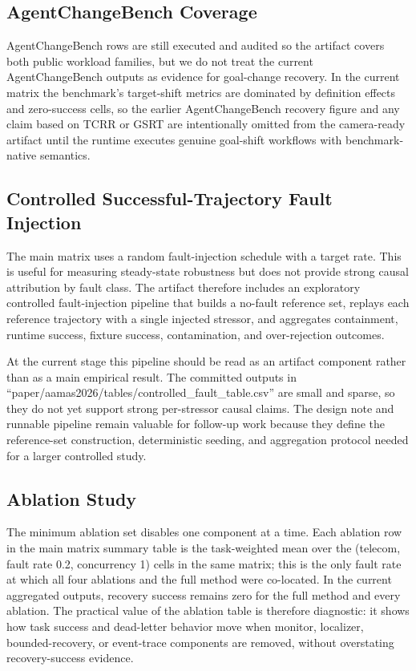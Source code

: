 \subsection{AgentChangeBench Coverage}

AgentChangeBench rows are still executed and audited so the artifact covers both public workload families, but we do not treat the current AgentChangeBench outputs as evidence for goal-change recovery. In the current matrix the benchmark's target-shift metrics are dominated by definition effects and zero-success cells, so the earlier AgentChangeBench recovery figure and any claim based on TCRR or GSRT are intentionally omitted from the camera-ready artifact until the runtime executes genuine goal-shift workflows with benchmark-native semantics.

\subsection{Controlled Successful-Trajectory Fault Injection}

The main matrix uses a random fault-injection schedule with a target rate. This is useful for measuring steady-state robustness but does not provide strong causal attribution by fault class. The artifact therefore includes an exploratory controlled fault-injection pipeline that builds a no-fault reference set, replays each reference trajectory with a single injected stressor, and aggregates containment, runtime success, fixture success, contamination, and over-rejection outcomes.

At the current stage this pipeline should be read as an artifact component rather than as a main empirical result. The committed outputs in ``paper/aamas2026/tables/controlled\_fault\_table.csv'' are small and sparse, so they do not yet support strong per-stressor causal claims. The design note and runnable pipeline remain valuable for follow-up work because they define the reference-set construction, deterministic seeding, and aggregation protocol needed for a larger controlled study.

\subsection{Ablation Study}

The minimum ablation set disables one \system{} component at a time. Each ablation row in the main matrix summary table is the task-weighted mean over the (telecom, fault rate 0.2, concurrency 1) cells in the same matrix; this is the only fault rate at which all four ablations and the full method were co-located. In the current aggregated outputs, recovery success remains zero for the full method and every ablation. The practical value of the ablation table is therefore diagnostic: it shows how task success and dead-letter behavior move when monitor, localizer, bounded-recovery, or event-trace components are removed, without overstating recovery-success evidence.

